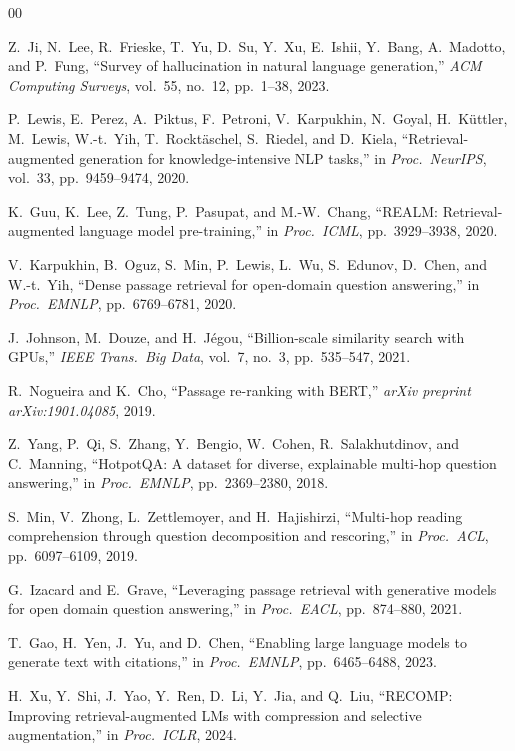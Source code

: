\documentclass[conference]{IEEEtran}
\begin{document}
\begin{thebibliography}{00}

Z.~Ji, N.~Lee, R.~Frieske, T.~Yu, D.~Su, Y.~Xu, E.~Ishii, Y.~Bang, A.~Madotto, and P.~Fung, ``Survey of hallucination in natural language generation,'' \textit{ACM Computing Surveys}, vol.~55, no.~12, pp.~1--38, 2023.

P.~Lewis, E.~Perez, A.~Piktus, F.~Petroni, V.~Karpukhin, N.~Goyal, H.~K{\"u}ttler, M.~Lewis, W.-t.~Yih, T.~Rockt{\"a}schel, S.~Riedel, and D.~Kiela, ``Retrieval-augmented generation for knowledge-intensive NLP tasks,'' in \textit{Proc.~NeurIPS}, vol.~33, pp.~9459--9474, 2020.

K.~Guu, K.~Lee, Z.~Tung, P.~Pasupat, and M.-W.~Chang, ``REALM: Retrieval-augmented language model pre-training,'' in \textit{Proc.~ICML}, pp.~3929--3938, 2020.

V.~Karpukhin, B.~Oguz, S.~Min, P.~Lewis, L.~Wu, S.~Edunov, D.~Chen, and W.-t.~Yih, ``Dense passage retrieval for open-domain question answering,'' in \textit{Proc.~EMNLP}, pp.~6769--6781, 2020.

J.~Johnson, M.~Douze, and H.~J{\'e}gou, ``Billion-scale similarity search with GPUs,'' \textit{IEEE Trans.~Big Data}, vol.~7, no.~3, pp.~535--547, 2021.

R.~Nogueira and K.~Cho, ``Passage re-ranking with BERT,'' \textit{arXiv preprint arXiv:1901.04085}, 2019.

Z.~Yang, P.~Qi, S.~Zhang, Y.~Bengio, W.~Cohen, R.~Salakhutdinov, and C.~Manning, ``HotpotQA: A dataset for diverse, explainable multi-hop question answering,'' in \textit{Proc.~EMNLP}, pp.~2369--2380, 2018.

S.~Min, V.~Zhong, L.~Zettlemoyer, and H.~Hajishirzi, ``Multi-hop reading comprehension through question decomposition and rescoring,'' in \textit{Proc.~ACL}, pp.~6097--6109, 2019.

G.~Izacard and E.~Grave, ``Leveraging passage retrieval with generative models for open domain question answering,'' in \textit{Proc.~EACL}, pp.~874--880, 2021.

T.~Gao, H.~Yen, J.~Yu, and D.~Chen, ``Enabling large language models to generate text with citations,'' in \textit{Proc.~EMNLP}, pp.~6465--6488, 2023.

H.~Xu, Y.~Shi, J.~Yao, Y.~Ren, D.~Li, Y.~Jia, and Q.~Liu, ``RECOMP: Improving retrieval-augmented LMs with compression and selective augmentation,'' in \textit{Proc.~ICLR}, 2024.


\end{thebibliography}
\end{document}
